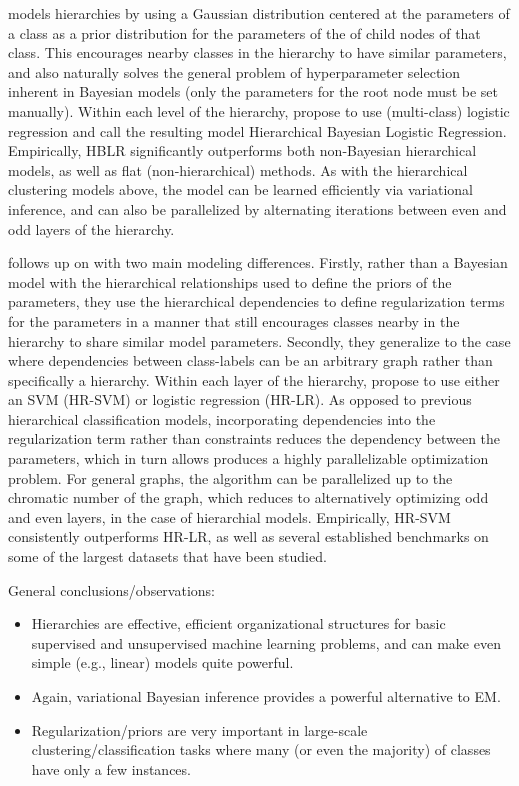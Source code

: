 \documentclass{article} %
\begin{document}
\cite{gopal12hierarchicalclass} models hierarchies by using a Gaussian
distribution centered at the parameters of a class as a prior distribution for
the parameters of the of child nodes of that class. This encourages nearby
classes in the hierarchy to have similar parameters, and also naturally solves
the general problem of hyperparameter selection inherent in Bayesian models
(only the parameters for the root node must be set manually). Within each level
of the hierarchy, \cite{gopal12hierarchicalclass} propose to use (multi-class)
logistic regression and call the resulting model Hierarchical Bayesian Logistic
Regression. Empirically, HBLR significantly outperforms both non-Bayesian
hierarchical models, as well as flat (non-hierarchical) methods. As with the
hierarchical clustering models above, the model can be learned efficiently via
variational inference, and can also be parallelized by alternating iterations
between even and odd layers of the hierarchy.

\cite{gopal13recursiveregularization} follows up on
\cite{gopal12hierarchicalclass} with two main modeling differences. Firstly,
rather than a Bayesian model with the hierarchical relationships used to define
the priors of the parameters, they use the hierarchical dependencies to define
regularization terms for the parameters in a manner that still encourages
classes nearby in the hierarchy to share similar model parameters. Secondly,
they generalize to the case where dependencies between class-labels can be an
arbitrary graph rather than specifically a hierarchy. Within each layer of the
hierarchy, \cite{gopal13recursiveregularization} propose to use either an SVM
(HR-SVM) or logistic regression (HR-LR). As opposed to previous hierarchical
classification models, incorporating dependencies into the regularization term
rather than constraints reduces the dependency between the parameters, which in
turn allows produces a highly parallelizable optimization problem. For general
graphs, the algorithm can be parallelized up to the chromatic number of the
graph, which reduces to alternatively optimizing odd and even layers, in the
case of hierarchial models. Empirically, HR-SVM consistently outperforms HR-LR,
as well as several established benchmarks on some of the largest datasets that
have been studied.

General conclusions/observations:
\begin{itemize}
\item Hierarchies are effective, efficient organizational structures for basic
supervised and unsupervised machine learning problems, and can make even simple
(e.g., linear) models quite powerful.
\item Again, variational Bayesian inference provides a powerful alternative to
EM.
\item Regularization/priors are very important in large-scale
clustering/classification tasks where many (or even the majority) of classes
have only a few instances.
\end{itemize}
\end{document}
